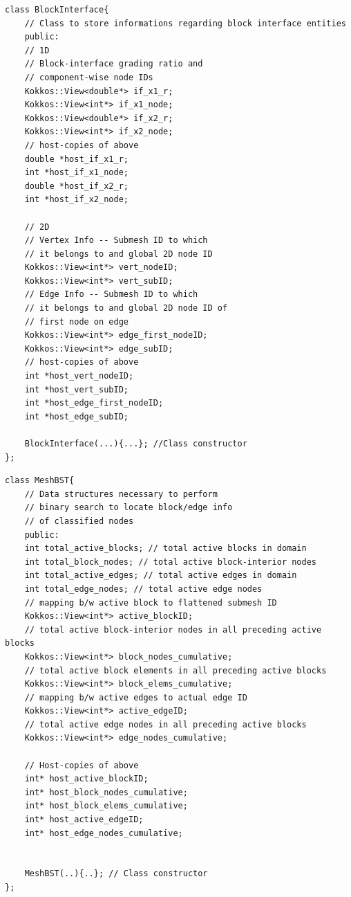 \documentclass[a4paper,12pt]{article}
\begin{document}
\begin{lstlisting}
class BlockInterface{
    // Class to store informations regarding block interface entities
    public:
    // 1D 
    // Block-interface grading ratio and 
    // component-wise node IDs
    Kokkos::View<double*> if_x1_r; 
    Kokkos::View<int*> if_x1_node; 
    Kokkos::View<double*> if_x2_r; 
    Kokkos::View<int*> if_x2_node; 
    // host-copies of above
    double *host_if_x1_r; 
    int *host_if_x1_node; 
    double *host_if_x2_r; 
    int *host_if_x2_node;
    
    // 2D
    // Vertex Info -- Submesh ID to which
    // it belongs to and global 2D node ID
    Kokkos::View<int*> vert_nodeID; 
    Kokkos::View<int*> vert_subID; 
    // Edge Info -- Submesh ID to which
    // it belongs to and global 2D node ID of 
    // first node on edge
    Kokkos::View<int*> edge_first_nodeID; 
    Kokkos::View<int*> edge_subID; 
    // host-copies of above
    int *host_vert_nodeID; 
    int *host_vert_subID; 
    int *host_edge_first_nodeID; 
    int *host_edge_subID; 
    
    BlockInterface(...){...}; //Class constructor
};
\end{lstlisting}

\begin{lstlisting}
class MeshBST{
    // Data structures necessary to perform
    // binary search to locate block/edge info
    // of classified nodes
    public:
    int total_active_blocks; // total active blocks in domain
    int total_block_nodes; // total active block-interior nodes
    int total_active_edges; // total active edges in domain
    int total_edge_nodes; // total active edge nodes
    // mapping b/w active block to flattened submesh ID
    Kokkos::View<int*> active_blockID; 
    // total active block-interior nodes in all preceding active blocks
    Kokkos::View<int*> block_nodes_cumulative; 
    // total active block elements in all preceding active blocks
    Kokkos::View<int*> block_elems_cumulative; 
    // mapping b/w active edges to actual edge ID
    Kokkos::View<int*> active_edgeID; 
    // total active edge nodes in all preceding active blocks
    Kokkos::View<int*> edge_nodes_cumulative; 
	
    // Host-copies of above
    int* host_active_blockID; 
    int* host_block_nodes_cumulative; 
    int* host_block_elems_cumulative; 
    int* host_active_edgeID; 
    int* host_edge_nodes_cumulative; 
	
	
    MeshBST(..){..}; // Class constructor
};
\end{lstlisting}
\end{document}
